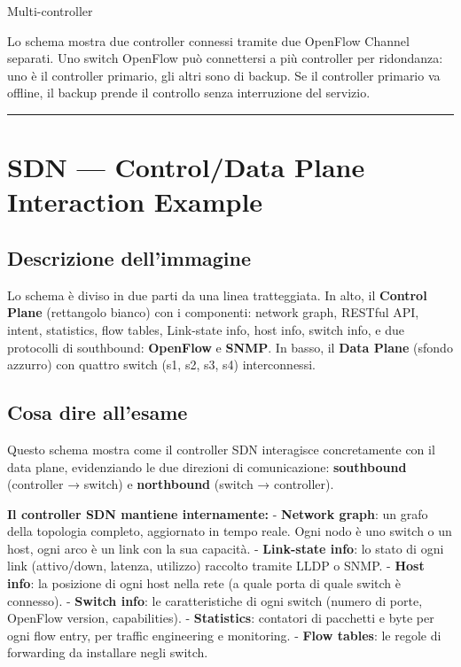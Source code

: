 \documentclass[
  italian,
  openany]{book}
\begin{document}
\begin{calloutnote}{Multi-controller}

Lo schema mostra due controller connessi tramite due OpenFlow Channel
separati. Uno switch OpenFlow può connettersi a più controller per
ridondanza: uno è il controller primario, gli altri sono di backup. Se
il controller primario va offline, il backup prende il controllo senza
interruzione del servizio.

\end{calloutnote}

\begin{center}\rule{0.5\linewidth}{0.5pt}\end{center}

\section{SDN --- Control/Data Plane Interaction
Example}\label{sdn-controldata-plane-interaction-example}

\subsection{Descrizione
dell'immagine}\label{descrizione-dellimmagine-10}

Lo schema è diviso in due parti da una linea tratteggiata. In alto, il
\textbf{Control Plane} (rettangolo bianco) con i componenti: network
graph, RESTful API, intent, statistics, flow tables, Link-state info,
host info, switch info, e due protocolli di southbound:
\textbf{OpenFlow} e \textbf{SNMP}. In basso, il \textbf{Data Plane}
(sfondo azzurro) con quattro switch (s1, s2, s3, s4) interconnessi.

\subsection{Cosa dire all'esame}\label{cosa-dire-allesame-10}

Questo schema mostra come il controller SDN interagisce concretamente
con il data plane, evidenziando le due direzioni di comunicazione:
\textbf{southbound} (controller → switch) e \textbf{northbound} (switch
→ controller).

\textbf{Il controller SDN mantiene internamente:} - \textbf{Network
graph}: un grafo della topologia completo, aggiornato in tempo reale.
Ogni nodo è uno switch o un host, ogni arco è un link con la sua
capacità. - \textbf{Link-state info}: lo stato di ogni link
(attivo/down, latenza, utilizzo) raccolto tramite LLDP o SNMP. -
\textbf{Host info}: la posizione di ogni host nella rete (a quale porta
di quale switch è connesso). - \textbf{Switch info}: le caratteristiche
di ogni switch (numero di porte, OpenFlow version, capabilities). -
\textbf{Statistics}: contatori di pacchetti e byte per ogni flow entry,
per traffic engineering e monitoring. - \textbf{Flow tables}: le regole
di forwarding da installare negli switch.
\end{document}
